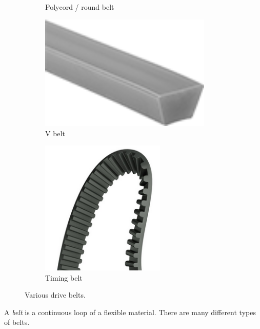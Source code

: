 \documentclass[10pt,letterpaper]{book}
\begin{document}
\begin{figure}[H]
\begin{subfigure}[b]{.24\linewidth}
		\caption{Polycord / round belt}
	\end{subfigure}\begin{subfigure}[b]{.24\linewidth}
		\includegraphics[width=0.9\textwidth]{imgs/belt_v.png}
		\caption{V belt}
	\end{subfigure}\begin{subfigure}[b]{.24\linewidth}
		\includegraphics[width=0.65\textwidth]{imgs/belt_timing.png}
		\caption{Timing belt}
	\end{subfigure}
	\caption{Various drive belts.}
\end{figure}

A \textit{belt} is a continuous loop of a flexible material. There are many different types of belts.
\end{document}
